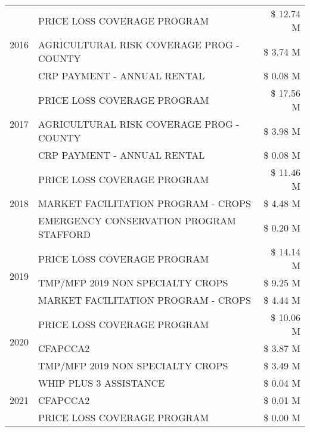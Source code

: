 \begin{tabular}{llr}
\multirow[t]{3}{*}{2016} & PRICE LOSS COVERAGE PROGRAM & \$ 12.74 M \\
 & AGRICULTURAL RISK COVERAGE PROG - COUNTY & \$ 3.74 M \\
 & CRP PAYMENT - ANNUAL RENTAL & \$ 0.08 M \\
\cline{1-3}
\multirow[t]{3}{*}{2017} & PRICE LOSS COVERAGE PROGRAM & \$ 17.56 M \\
 & AGRICULTURAL RISK COVERAGE PROG - COUNTY & \$ 3.98 M \\
 & CRP PAYMENT - ANNUAL RENTAL & \$ 0.08 M \\
\cline{1-3}
\multirow[t]{3}{*}{2018} & PRICE LOSS COVERAGE PROGRAM & \$ 11.46 M \\
 & MARKET FACILITATION PROGRAM - CROPS & \$ 4.48 M \\
 & EMERGENCY CONSERVATION PROGRAM STAFFORD & \$ 0.20 M \\
\cline{1-3}
\multirow[t]{3}{*}{2019} & PRICE LOSS COVERAGE PROGRAM & \$ 14.14 M \\
 & TMP/MFP 2019 NON SPECIALTY CROPS & \$ 9.25 M \\
 & MARKET FACILITATION PROGRAM - CROPS & \$ 4.44 M \\
\cline{1-3}
\multirow[t]{3}{*}{2020} & PRICE LOSS COVERAGE PROGRAM & \$ 10.06 M \\
 & CFAPCCA2 & \$ 3.87 M \\
 & TMP/MFP 2019 NON SPECIALTY CROPS & \$ 3.49 M \\
\cline{1-3}
\multirow[t]{3}{*}{2021} & WHIP PLUS 3 ASSISTANCE & \$ 0.04 M \\
 & CFAPCCA2 & \$ 0.01 M \\
 & PRICE LOSS COVERAGE PROGRAM & \$ 0.00 M \\
\cline{1-3}
\bottomrule
\end{tabular}
